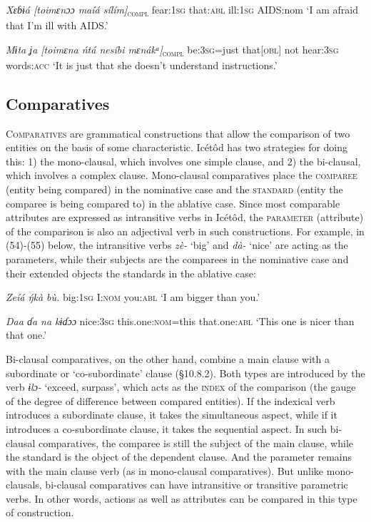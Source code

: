\textit{Xɛɓɨá     [toimɛnɔɔ   maíá     sílím]}\textsc{\textsubscript{compl}}
fear:\textsc{1sg}   that:\textsc{abl}   ill:\textsc{1sg}   AIDS:nom
‘I am afraid that I’m ill with AIDS.’




\textit{Mɨta ʝa   [toimɛna   ńtá   nesíbi       mɛnákᵃ]}\textsc{\textsubscript{compl}}
be:\textsc{3sg}=just   that[\textsc{obl}]   not   hear:\textsc{3sg} words:\textsc{acc}
‘It is just that she doesn’t understand instructions.’






\subsection{Comparatives}


\textsc{Comparatives} are grammatical constructions that allow the comparison of two entities on the basis of some characteristic. Icétôd has two strategies for doing this: 1) the mono-clausal, which involves one simple clause, and 2) the bi-clausal, which involves a complex clause. Mono-clausal comparatives place the \textsc{comparee} (entity being compared) in the nominative case and the \textsc{standard} (entity the comparee is being compared to) in the ablative case. Since most comparable attributes are expressed as intransitive verbs in Icétôd, the \textsc{parameter} (attribute) of the comparison is also an adjectival verb in such constructions. For example, in (54)-(55) below, the intransitive verbs \textit{zè-} ‘big’ and \textit{dà-} ‘nice’ are acting as the parameters, while their subjects are the comparees in the nominative case and their extended objects the standards in the ablative case:




\textit{Zeíá     \'{ŋ}kà     bù.}
big:\textsc{1sg}   I:\textsc{nom}   you:\textsc{abl}
‘I am bigger than you.’




\textit{Daa     ɗa na       kɨɗɔɔ}
nice:\textsc{3sg}   this.one:\textsc{nom}=this   that.one:\textsc{abl}
‘This one is nicer than that one.’


Bi-clausal comparatives, on the other hand, combine a main clause with a subordinate or ‘co-subordinate’ clause (§10.8.2). Both types are introduced by the verb \textit{ɨlɔ-} ‘exceed, surpass’, which acts as the \textsc{index} of the comparison (the gauge of the degree of difference between compared entities). If the indexical verb introduces a subordinate clause, it takes the simultaneous aspect, while if it introduces a co-subordinate clause, it takes the sequential aspect. In such bi-clausal comparatives, the comparee is still the subject of the main clause, while the standard is the object of the dependent clause. And the parameter remains with the main clause verb (as in mono-clausal comparatives). But unlike mono-clausals, bi-clausal comparatives can have intransitive or transitive parametric verbs. In other words, actions as well as attributes can be compared in this type of construction.

